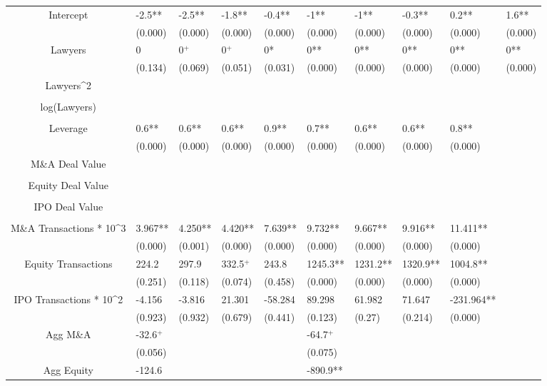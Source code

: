 \documentclass{article}
\begin{document}
\begin{table}[H]
\begin{tabular}{|clllllllll|}
Intercept & -2.5** & -2.5** & -1.8** & -0.4** & -1** & -1** & -0.3** & 0.2** & 1.6** \\
   & (0.000) & (0.000) & (0.000) & (0.000) & (0.000) & (0.000) & (0.000) & (0.000) & (0.000) \\
  Lawyers & 0 & 0$^{+}$ & 0$^{+}$ & 0* & 0** & 0** & 0** & 0** & 0** \\
   & (0.134) & (0.069) & (0.051) & (0.031) & (0.000) & (0.000) & (0.000) & (0.000) & (0.000) \\
  Lawyers^2 &  &  &  &  &  &  &  &  &  \\
   &  &  &  &  &  &  &  &  &  \\
  log(Lawyers) &  &  &  &  &  &  &  &  &  \\
   &  &  &  &  &  &  &  &  &  \\
  Leverage & 0.6** & 0.6** & 0.6** & 0.9** & 0.7** & 0.6** & 0.6** & 0.8** &  \\
   & (0.000) & (0.000) & (0.000) & (0.000) & (0.000) & (0.000) & (0.000) & (0.000) &  \\
  M\&A Deal Value &  &  &  &  &  &  &  &  &  \\
   &  &  &  &  &  &  &  &  &  \\
  Equity Deal Value &  &  &  &  &  &  &  &  &  \\
   &  &  &  &  &  &  &  &  &  \\
  IPO Deal Value &  &  &  &  &  &  &  &  &  \\
   &  &  &  &  &  &  &  &  &  \\
  M\&A Transactions * 10^3 & 3.967** & 4.250** & 4.420** & 7.639** & 9.732** & 9.667** & 9.916** & 11.411** &  \\
   & (0.000) & (0.001) & (0.000) & (0.000) & (0.000) & (0.000) & (0.000) & (0.000) &  \\
  Equity Transactions & 224.2 & 297.9 & 332.5$^{+}$ & 243.8 & 1245.3** & 1231.2** & 1320.9** & 1004.8** &  \\
   & (0.251) & (0.118) & (0.074) & (0.458) & (0.000) & (0.000) & (0.000) & (0.000) &  \\
  IPO Transactions * 10^2 & -4.156 & -3.816 & 21.301 & -58.284 & 89.298 & 61.982 & 71.647 & -231.964** &  \\
   & (0.923) & (0.932) & (0.679) & (0.441) & (0.123) & (0.27) & (0.214) & (0.000) &  \\
  Agg M\&A & -32.6$^{+}$ &  &  &  & -64.7$^{+}$ &  &  &  &  \\
   & (0.056) &  &  &  & (0.075) &  &  &  &  \\
  Agg Equity & -124.6 &  &  &  & -890.9** &  &  &  &  \\

\end{tabular}
\end{table}
\end{document}
